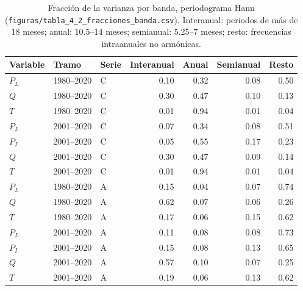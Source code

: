 \documentclass[11pt,a4paper]{article}
\newcommand{\archivo}[1]{\nolinkurl{#1}}
\newcommand{\PL}{P_L}
\newcommand{\PI}{P_I}
\newcommand{\Qm}{Q}
\begin{document}
\begin{table}[H]
\centering\small
\caption{Fracción de la varianza por banda, periodograma Hann (\archivo{figuras/tabla_4_2_fracciones_banda.csv}). Interanual: periodos de más de 18 meses; anual: 10.5--14 meses; semianual: 5.25--7 meses; resto: frecuencias intraanuales no armónicas.}
\label{tab:bandas}
\begin{tabular}{lllrrrr}
\toprule
Variable & Tramo & Serie & Interanual & Anual & Semianual & Resto \\
\midrule
$\PL$ & 1980--2020 & C & 0.10 & 0.32 & 0.08 & 0.50 \\
$\Qm$ & 1980--2020 & C & 0.30 & 0.47 & 0.10 & 0.13 \\
$T$ & 1980--2020 & C & 0.01 & 0.94 & 0.01 & 0.04 \\
$\PL$ & 2001--2020 & C & 0.07 & 0.34 & 0.08 & 0.51 \\
$\PI$ & 2001--2020 & C & 0.05 & 0.55 & 0.17 & 0.23 \\
$\Qm$ & 2001--2020 & C & 0.30 & 0.47 & 0.09 & 0.14 \\
$T$ & 2001--2020 & C & 0.01 & 0.94 & 0.01 & 0.04 \\
\midrule
$\PL$ & 1980--2020 & A & 0.15 & 0.04 & 0.07 & 0.74 \\
$\Qm$ & 1980--2020 & A & 0.62 & 0.07 & 0.06 & 0.26 \\
$T$ & 1980--2020 & A & 0.17 & 0.06 & 0.15 & 0.62 \\
$\PL$ & 2001--2020 & A & 0.11 & 0.08 & 0.08 & 0.73 \\
$\PI$ & 2001--2020 & A & 0.15 & 0.08 & 0.13 & 0.65 \\
$\Qm$ & 2001--2020 & A & 0.57 & 0.10 & 0.07 & 0.25 \\
$T$ & 2001--2020 & A & 0.19 & 0.06 & 0.13 & 0.62 \\
\bottomrule
\end{tabular}
\end{table}
\end{document}
